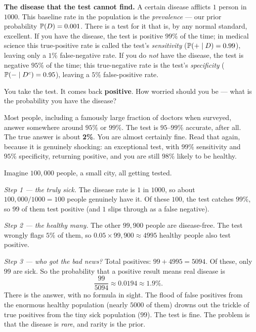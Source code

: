 \begin{paradoxbox}
\textbf{The disease that the test cannot find.} A certain disease afflicts $1$ person in
$1000$. This baseline rate in the population is the \emph{prevalence} --- our prior
probability $\P(D) = 0.001$. There is a test for it that is, by any normal standard,
excellent. If you have the disease, the test is positive $99\%$ of the time; in medical
science this true-positive rate is called the test's \emph{sensitivity} ($\P(+ \given D) =
0.99$), leaving only a $1\%$ false-negative rate. If you do \emph{not} have the disease,
the test is negative $95\%$ of the time; this true-negative rate is the test's
\emph{specificity} ($\P(- \given D^c) = 0.95$), leaving a $5\%$ false-positive rate.

You take the test. It comes back \textbf{positive}. How worried should you be --- what is
the probability you have the disease?

Most people, including a famously large fraction of doctors when surveyed, answer
somewhere around $95\%$ or $99\%$. The test is $95$--$99\%$ accurate, after all. The
true answer is about \textbf{2\%}. You are almost certainly fine. Read that again,
because it is genuinely shocking: an exceptional test, with $99\%$ sensitivity and $95\%$
specificity, returning positive, and you are still $98\%$ likely to be healthy.
\end{paradoxbox}

\begin{walkbox}
Imagine $100{,}000$ people, a small city, all getting tested.

\emph{Step 1 --- the truly sick.} The disease rate is $1$ in $1000$, so about
$100{,}000 / 1000 = 100$ people genuinely have it. Of these $100$, the test catches
$99\%$, so $99$ of them test positive (and $1$ slips through as a false negative).

\emph{Step 2 --- the healthy many.} The other $99{,}900$ people are disease-free. The
test wrongly flags $5\%$ of them, so $0.05 \times 99{,}900 \approx 4995$ healthy people
also test positive.

\emph{Step 3 --- who got the bad news?} Total positives:
$99 + 4995 = 5094$. Of these, only $99$ are sick. So the probability that a
positive result means real disease is
\[
  \frac{99}{5094} \approx 0.0194 \approx 1.9\%.
\]
There is the answer, with no formula in sight. The flood of false positives from the
enormous healthy population (nearly $5000$ of them) drowns out the trickle of true
positives from the tiny sick population ($99$). The test is fine. The problem is
that the disease is \emph{rare}, and rarity is the prior.
\end{walkbox}

